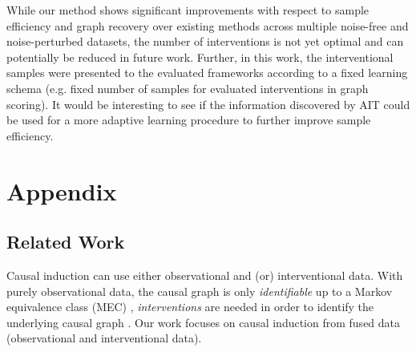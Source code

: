 \documentclass[nohyperref]{article}
\theoremstyle{plain}
\theoremstyle{definition}
\theoremstyle{remark}
\newcommand\DoToC{%
  \startcontents
  \printcontents{}{2}{\textbf{Contents}\vskip3pt\hrule\vskip5pt}
  \vskip3pt\hrule\vskip5pt
}
\begin{document}
While our method shows significant improvements with respect to sample efficiency and graph recovery over existing methods across multiple noise-free and noise-perturbed datasets, the number of interventions is not yet optimal \citep{atkinson1975optimal, eberhardt2012number} and can potentially be reduced in future work. Further, in this work, the interventional samples were presented to the evaluated frameworks according to a fixed learning schema (e.g. fixed number of samples for evaluated interventions in graph scoring). It would be interesting to see if the information discovered by AIT could be used for a more adaptive learning procedure to further improve sample efficiency.


\clearpage




\newpage
\onecolumn
\appendix
\section{Appendix}



\subsection{Related Work}
\label{sec:relatedWork}
 Causal induction can use  either observational and (or) interventional data. With purely observational data, the causal graph is only \textit{identifiable} up to a Markov equivalence class (MEC) \citep{spirtes2000causation}, \textit{interventions} are needed in order to identify the underlying causal graph \citep{eberhardt2007interventions}. Our work focuses on causal induction from fused data (observational and interventional data). 
\end{document}
